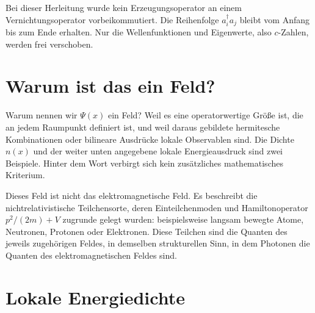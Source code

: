 Bei dieser Herleitung wurde kein Erzeugungsoperator an einem Vernichtungsoperator vorbeikommutiert. Die Reihenfolge \(a_i^\dagger a_j\) bleibt vom Anfang bis zum Ende erhalten. Nur die Wellenfunktionen und Eigenwerte, also \(c\)-Zahlen, werden frei verschoben.

\section{Warum ist das ein Feld?}

Warum nennen wir \(\Psi(x)\) ein Feld? Weil es eine operatorwertige Größe ist, die an jedem Raumpunkt definiert ist, und weil daraus gebildete hermitesche Kombinationen oder bilineare Ausdrücke lokale Observablen sind. Die Dichte \(n(x)\) und der weiter unten angegebene lokale Energieausdruck sind zwei Beispiele. Hinter dem Wort verbirgt sich kein zusätzliches mathematisches Kriterium.

Dieses Feld ist nicht das elektromagnetische Feld. Es beschreibt die nichtrelativistische Teilchensorte, deren Einteilchenmoden und Hamiltonoperator \(p^2/(2m)+V\) zugrunde gelegt wurden: beispielsweise langsam bewegte Atome, Neutronen, Protonen oder Elektronen. Diese Teilchen sind die Quanten des jeweils zugehörigen Feldes, in demselben strukturellen Sinn, in dem Photonen die Quanten des elektromagnetischen Feldes sind.

\begin{classroomqa}
\end{classroomqa}

\section{Lokale Energiedichte}


